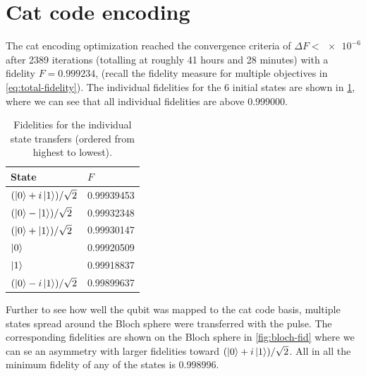 \documentclass[main.tex]{subfiles}
\begin{document}
\clearpage{}
\section{Cat code encoding}
The cat encoding optimization reached the convergence criteria of \(\Delta F < \num{e-6}\) after 2389 iterations (totalling at roughly 41 hours and 28 minutes) with a fidelity \(F = 0.999234\), (recall the fidelity measure for multiple objectives in \cref{eq:total-fidelity}).
The individual fidelities for the 6 initial states are shown in \cref{tab:cat-fidelities}, where we can see that all individual fidelities are above 0.999000.

\begin{table}[ht]
    \caption{Fidelities for the individual state transfers (ordered from highest to lowest).}%
    \label{tab:cat-fidelities}
    \centering
    \begin{tabular}{@{}ll@{}}
    \toprule
    State & \(F\)\\ \midrule
	\((\ket{0}+i\ket{1})/\sqrt{2}\) & 0.99939453 \\
	\((\ket{0}-\ket{1})/\sqrt{2}\) & 0.99932348 \\
	\((\ket{0}+\ket{1})/\sqrt{2}\) & 0.99930147 \\
    \(\ket{0}\) & 0.99920509 \\
	\(\ket{1}\) & 0.99918837 \\
	\((\ket{0}-i\ket{1})/\sqrt{2}\) & 0.99899637 \\
    \bottomrule
    \end{tabular}
\end{table}

Further to see how well the qubit was mapped to the cat code basis, multiple states spread around the Bloch sphere were transferred with the pulse.
The corresponding fidelities are shown on the Bloch sphere in \cref{fig:bloch-fid} where we can se an asymmetry with larger fidelities toward \((\ket{0}+i\ket{1})/\sqrt{2}\).
All in all the minimum fidelity of any of the states is 0.998996.
\end{document}
